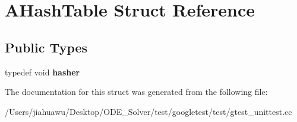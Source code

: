 \hypertarget{struct_a_hash_table}{}\section{A\+Hash\+Table Struct Reference}
\label{struct_a_hash_table}
\subsection*{Public Types}
\begin{DoxyCompactItemize}
\item 
\mbox{\label{struct_a_hash_table_af0df4ce57a783be396e80cb8df6b6259}} 
typedef void {\bfseries hasher}
\end{DoxyCompactItemize}


The documentation for this struct was generated from the following file\+:\begin{DoxyCompactItemize}
\item 
/\+Users/jiahuawu/\+Desktop/\+O\+D\+E\+\_\+\+Solver/test/googletest/test/gtest\+\_\+unittest.\+cc\end{DoxyCompactItemize}
